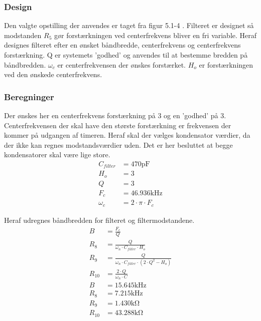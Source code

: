 \subsubsection{Design}
Den valgte opstilling der anvendes er taget fra figur 5.1-4 \cite[side. 208]{Huelsman1993}.
Filteret er designet så modstanden $R_5$ gør forstærkningen ved centerfrekvens bliver en fri variable.
Heraf designes filteret efter en ønsket båndbredde, centerfrekvens og centerfrekvens forstærkning. Q er systemets 'godhed' og anvendes til at bestemme bredden på båndbredden. 
$\omega_c$ er centerfrekvensen der ønskes forstærket.
$H_o$ er forstærkningen ved den ønskede centerfrekvens.

\subsubsection{Beregninger}
Der ønskes her en centerfrekvens forstærkning på 3 og en 'godhed' på 3. Centerfrekvensen der skal have den største forstærkning er frekvensen der kommer på udgangen af timeren. Heraf skal der vælges kondensator værdier, da der ikke kan regnes modstandsværdier uden. Det er her besluttet at begge kondensatorer skal være lige store.
\begin{align}
C_{filter} & = 470 \si{\pico\farad} \nonumber \\
H_o & = 3 \nonumber \\
Q & = 3 \nonumber \\
F_c & = 46.936 \si{\kilo\hertz} \nonumber \\
\omega_c & = 2 \cdot \pi \cdot F_c
\end{align}

Heraf udregnes båndbredden for filteret og filtermodstandene. 
\begin{align}
B & = \frac{F_c}{Q} \\
R_8 & = \frac{Q}{\omega_n \cdot C_{filter} \cdot H_o } \\
R_9 & = \frac{Q}{ \omega_n \cdot C_{filter} \cdot \left( 2 \cdot Q^2 - H_o \right) } \\
R_{10} & = \frac{2 \cdot Q}{ \omega_n \cdot C} \\
B & = 15.645 \si{\kilo\hertz} \nonumber \\
R_8 & = 7.215 \si{\kilo\hertz} \nonumber \\
R_9 & = 1.430 \si{\kilo\ohm} \nonumber \\
R_{10} & = 43.288 \si{\kilo\ohm} \nonumber 
\end{align}


